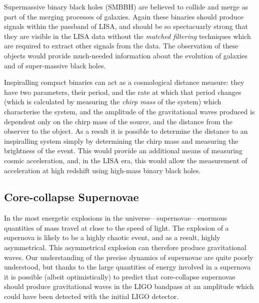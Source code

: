 \documentclass{kentigern}
\begin{document}
Supermassive binary black holes (SMBBH) are believed to collide and
merge as part of the merging processes of galaxies. Again these
binaries should produce signals within the passband of LISA\cite{2012CQGra..29l4016A}, and
should be so spectacuarly strong that they are visible in the LISA
data without the \emph{matched filtering} techniques which are
required to extract other signals from the data\cite{2009LRR....12....2S}. The observation of
these objects would provide much-needed information about the
evolution of galaxies and of super-massive black holes.

Inspiralling compact binaries can act as a cosmological distance
measure: they have two parameters, their period, and the rate at which
that period changes (which is calculated by measuring the \emph{chirp
  mass} of the system) which characterise the system, and the
amplitude of the gravitational waves produced is dependent only on the
chirp mass of the source, and the distance from the observer to the
object. As a result it is possible to determine the distance to an
inspiralling system simply by determining the chirp mass and measuring
the brightness of the event. This would provide an additional means of
measuring cosmic acceleration, and, in the LISA era, this would allow
the measurement of acceleration at high redshift using high-mass
binary black holes.



\subsection{Core-collapse Supernovae}
\label{sec:sn}

In the most energetic explosions in the
universe---supernovae---enormous quantities of mass travel at close to
the speed of light. The explosion of a supernova is likely to be a
highly chaotic event, and as a result, highly asymmetrical. This
asymmetrical explosion can therefore produce gravitational waves. Our
understanding of the precise dynamics of supernovae are quite poorly
understood, but thanks to the large quantities of energy involved in a
supernova it is possible (albeit optimistically) to predict that
core-collapse supernovae should produce gravitational waves in the
LIGO bandpass at an amplitude which could have been detected with the
initial LIGO detector\cite{2009LRR....12....2S}.
\end{document}
